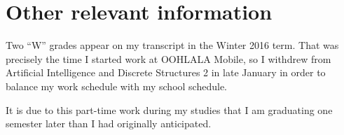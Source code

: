 \documentclass[11pt,letterpaper]{article}
\begin{document}
\section{Other relevant information}

Two ``W'' grades appear on my transcript in the Winter 2016 term. That was
precisely the time I started work at OOHLALA Mobile, so I withdrew from
Artificial Intelligence and Discrete Structures 2 in late January in order to
balance my work schedule with my school schedule.

It is due to this part-time work during my studies that I am graduating one
semester later than I had originally anticipated.
\end{document}

